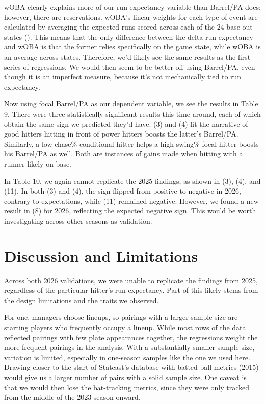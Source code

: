 \documentclass{article}
\begin{document}
wOBA clearly explains more of our run expectancy variable than Barrel/PA does; however, there are reservations. wOBA's linear weights for each type of event are calculated by averaging the expected runs scored across each of the 24 base-out states (\cite{tango2007book}). This means that the only difference between the delta run expectancy and wOBA is that the former relies specifically on the game state, while wOBA is an average across states. Therefore, we'd likely see the same results as the first series of regressions. We would then seem to be better off using Barrel/PA, even though it is an imperfect measure, because it's not mechanically tied to run expectancy.

Now using focal Barrel/PA as our dependent variable, we see the results in Table 9. There were three statistically significant results this time around, each of which obtain the same sign we predicted they'd have. (3) and (4) fit the narrative of good hitters hitting in front of power hitters boosts the latter's Barrel/PA. Similarly, a low-chase\% conditional hitter helps a high-swing\% focal hitter boosts his Barrel/PA as well. Both are instances of gains made when hitting with a runner likely on base.

In Table 10, we again cannot replicate the 2025 findings, as shown in (3), (4), and (11). In both (3) and (4), the sign flipped from positive to negative in 2026, contrary to expectations, while (11) remained negative. However, we found a new result in (8) for 2026, reflecting the expected negative sign. This would be worth investigating across other seasons as validation.

\section{ Discussion and Limitations}

Across both 2026 validations, we were unable to replicate the findings from 2025, regardless of the particular hitter's run expectancy. Part of this likely stems from the design limitations and the traits we observed.

For one, managers choose lineups, so pairings with a larger sample size are starting players who frequently occupy a lineup. While most rows of the data reflected pairings with few plate appearances together, the regressions weight the more frequent pairings in the analysis. With a substantially smaller sample size, variation is limited, especially in one-season samples like the one we used here. Drawing closer to the start of Statcast's database with batted ball metrics (2015) would give us a larger number of pairs with a solid sample size. One caveat is that we would then lose the bat-tracking metrics, since they were only tracked from the middle of the 2023 season onward.
\end{document}
